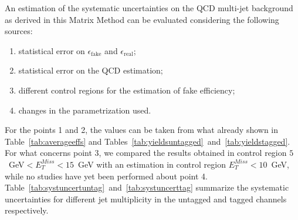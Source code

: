 \begin{table}[h!tb]\centering
{}
\caption{Yields table for the data and background samples for different jet multiplicities in the tagged full event selection (at least one bjet).}\label{tab:yieldstagged}
\end{table} 


An estimation of the systematic uncertainties on the QCD multi-jet background
as derived in this Matrix Method
can be evaluated considering the following sources:
\begin{enumerate}
 \item statistical error on  $\epsilon_\mathrm{fake}$ and  $\epsilon_\mathrm{real}$;
\item statistical error on the QCD estimation;
\item different control regions for the estimation of fake efficiency;
\item changes in the parametrization used.
\end{enumerate} 
For the points 1 and 2, the values can be taken from what already 
shown in Table~\ref{tab:averageeffs} and 
Tables~\ref{tab:yieldsuntagged}~and~\ref{tab:yieldstagged}. For what 
concerns point 3, we compared the results obtained in control region 
$5$~GeV$< E^{Miss}_T<15$~GeV with an estimation in control region 
$ E^{Miss}_T<10$~GeV, while no studies have yet been performed about 
point 4. Table~\ref{tab:systuncertuntag}~and~\ref{tab:systuncerttag} 
summarize the systematic uncertainties for different jet multiplicity 
in the untagged and tagged channels respectively.


